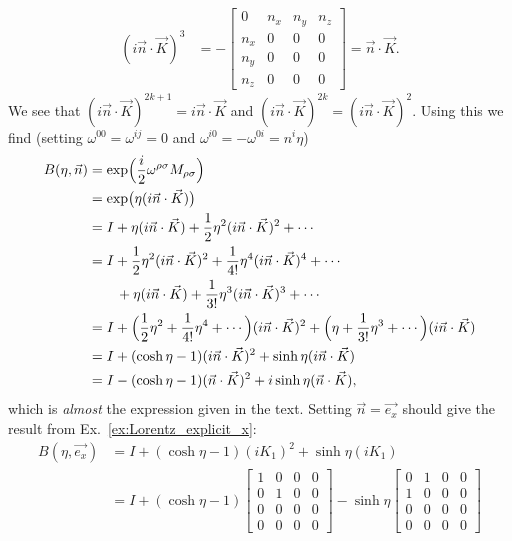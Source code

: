 \documentclass[notes.tex]{subfiles}
\begin{document}
\begin{Answer}
\begin{align*}
    \\
    (i \vec{n} \cdot \vec{K})^3 &= - \begin{bmatrix}
        0 & n_x & n_y & n_z \\
        n_x & 0 & 0 & 0 \\
        n_y & 0 & 0 & 0 \\
        n_z & 0 & 0 & 0
    \end{bmatrix} = \vec{n}\cdot\vec{K}.
\end{align*}
We see that $(i \vec{n}\cdot\vec{K})^{2k+1}= i \vec{n}\cdot\vec{K}$ and $(i \vec{n}\cdot\vec{K})^{2k}=(i \vec{n}\cdot\vec{K})^2$. Using this we find (setting $\omega^{00}=\omega^{ij}=0$ and $\omega^{i0}=-\omega^{0i}=n^i \eta$)
\begin{align*}
    B(\eta,\vec{n}) &= \exp\Bigl(\frac{i}{2}\omega^{\rho\sigma}M_{\rho\sigma}\Bigr)
    \\
    &= \exp \bigl(\eta (i \vec{n}\cdot\vec{K})\bigr)
    \\
    &= I+\eta(i\vec{n}\cdot\vec{K})+\frac{1}{2}\eta^2(i\vec{n}\cdot\vec{K})^2+\cdots
    \\
    &= I+\frac{1}{2}\eta^2(i \vec{n}\cdot\vec{K})^2+\frac{1}{4!}\eta^4(i\vec{n}\cdot\vec{K})^4+\cdots
    \\ &\qquad +\eta(i\vec{n}\cdot\vec{K})+\frac{1}{3!}\eta^3(i\vec{n}\cdot\vec{K})^3+\cdots
    \\
    &= I + \Bigl(\frac{1}{2}\eta^2+\frac{1}{4!}\eta^4+\cdots\Bigr)(i\vec{n}\cdot\vec{K})^2+\Bigl(\eta+\frac{1}{3!}\eta^3+\cdots\Bigr)(i\vec{n}\cdot\vec{K})
    \\
    &= I + (\cosh\eta-1)(i\vec{n}\cdot\vec{K})^2+\sinh\eta (i\vec{n}\cdot\vec{K})
    \\
    &= I - (\cosh\eta-1)(\vec{n}\cdot\vec{K})^2+i\sinh\eta(\vec{n}\cdot\vec{K}),
\end{align*}
which is \emph{almost} the expression given in the text. Setting $\vec{n}=\vec{e_x}$ should give the result from Ex.~\ref{ex:Lorentz_explicit_x}:
\begin{align*}
    B(\eta,\vec{e_x})&=I+(\cosh\eta-1)(iK_1)^2+\sinh\eta(iK_1)
    \\
    &= I+(\cosh\eta-1)\begin{bmatrix}
        1&0&0&0 \\ 0&1&0&0 \\ 0&0&0&0 \\ 0&0&0&0
    \end{bmatrix} -\sinh\eta \begin{bmatrix}
        0&1&0&0 \\ 1&0&0&0 \\ 0&0&0&0 \\ 0&0&0&0

\end{bmatrix}
\end{align*}
\end{Answer}
\end{document}
